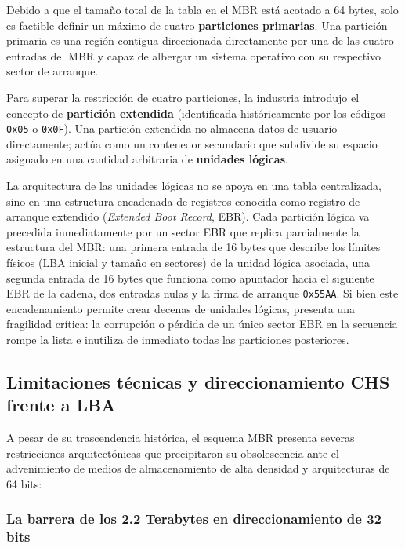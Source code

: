 \documentclass[12pt]{article}
\begin{document}
Debido a que el tamaño total de la tabla en el MBR está acotado a 64 bytes, solo es factible definir un máximo de cuatro \textbf{particiones primarias}. Una partición primaria es una región contigua direccionada directamente por una de las cuatro entradas del MBR y capaz de albergar un sistema operativo con su respectivo sector de arranque.

Para superar la restricción de cuatro particiones, la industria introdujo el concepto de \textbf{partición extendida} (identificada históricamente por los códigos \texttt{0x05} o \texttt{0x0F}). Una partición extendida no almacena datos de usuario directamente; actúa como un contenedor secundario que subdivide su espacio asignado en una cantidad arbitraria de \textbf{unidades lógicas}.

La arquitectura de las unidades lógicas no se apoya en una tabla centralizada, sino en una estructura encadenada de registros conocida como registro de arranque extendido (\textit{Extended Boot Record}, EBR). Cada partición lógica va precedida inmediatamente por un sector EBR que replica parcialmente la estructura del MBR: una primera entrada de 16 bytes que describe los límites físicos (LBA inicial y tamaño en sectores) de la unidad lógica asociada, una segunda entrada de 16 bytes que funciona como apuntador hacia el siguiente EBR de la cadena, dos entradas nulas y la firma de arranque \texttt{0x55AA}. Si bien este encadenamiento permite crear decenas de unidades lógicas, presenta una fragilidad crítica: la corrupción o pérdida de un único sector EBR en la secuencia rompe la lista e inutiliza de inmediato todas las particiones posteriores.

\subsection{Limitaciones técnicas y direccionamiento CHS frente a LBA}
\label{subsec:limitacionesMbr}

A pesar de su trascendencia histórica, el esquema MBR presenta severas restricciones arquitectónicas que precipitaron su obsolescencia ante el advenimiento de medios de almacenamiento de alta densidad y arquitecturas de 64 bits:

\subsubsection{La barrera de los 2.2 Terabytes en direccionamiento de 32 bits}
\end{document}
